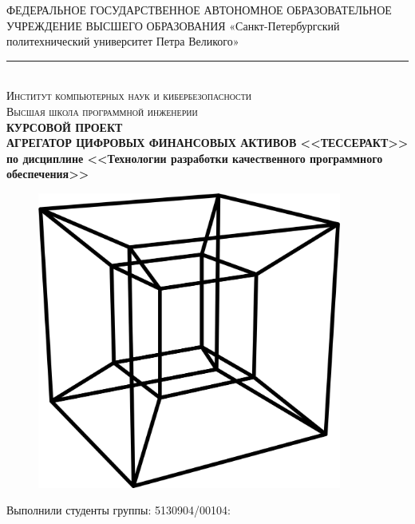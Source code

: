 \documentclass[a4paper, 14pt]{article}
\begin{document}
\begin{titlepage}
    \center

    ФЕДЕРАЛЬНОЕ ГОСУДАРСТВЕННОЕ АВТОНОМНОЕ ОБРАЗОВАТЕЛЬНОЕ УЧРЕЖДЕНИЕ ВЫСШЕГО ОБРАЗОВАНИЯ\linebreak
    «Санкт-Петербургский политехнический университет Петра Великого»
    \noindent\rule{500pt}{0.8pt} \\
    \textsc{\Large Институт компьютерных наук и кибербезопасности}\\
    \textsc{\large Высшая школа программной инженерии}\\[1.5cm]

    { \huge \bfseries КУРСОВОЙ ПРОЕКТ	\\
    \Large \mdseries АГРЕГАТОР ЦИФРОВЫХ ФИНАНСОВЫХ АКТИВОВ <<ТЕССЕРАКТ>> \\
    \large по дисциплине <<Технологии разработки качественного программного обеспечения>>}\\
    \flushright{
        {\phantom{qwe}}\\[1.0cm]
    }

    \begin{figure}[H]
        \centering
        \includegraphics[width=10cm]{1.png}\\[2.0cm]
    \end{figure}

    \begin{multicols}{2}
        \begin{flushright} \large

            {Выполнили студенты группы: 5130904/00104:}\\
            {\phantom{qwe}}\\
            {\phantom{qwe}}\\
            {\phantom{qwe}}\\
            {\phantom{qwe}}\\


\end{flushright}
\end{multicols}
\end{titlepage}
\end{document}
